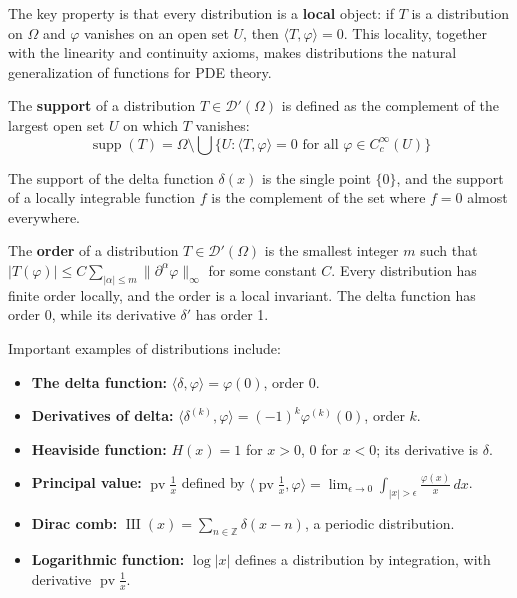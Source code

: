 The key property is that every distribution is a \textbf{local} object: if $T$ is a distribution on $\Omega$ and $\varphi$ vanishes on an open set $U$, then $\langle T, \varphi \rangle = 0$. This locality, together with the linearity and continuity axioms, makes distributions the natural generalization of functions for PDE theory.

\begin{definition}[Support]
The \textbf{support} of a distribution $T \in \mathcal{D}'(\Omega)$ is defined as the complement of the largest open set $U$ on which $T$ vanishes:
\[\operatorname{supp}(T) = \Omega \setminus \bigcup \{U : \langle T, \varphi \rangle = 0 \text{ for all } \varphi \in C_c^\infty(U)\}\]
\end{definition}

The support of the delta function $\delta(x)$ is the single point $\{0\}$, and the support of a locally integrable function $f$ is the complement of the set where $f = 0$ almost everywhere.

\begin{definition}[Order]
The \textbf{order} of a distribution $T \in \mathcal{D}'(\Omega)$ is the smallest integer $m$ such that $|T(\varphi)| \leq C \sum_{|\alpha| \leq m} \|\partial^\alpha \varphi\|_\infty$ for some constant $C$. Every distribution has finite order locally, and the order is a local invariant. The delta function has order 0, while its derivative $\delta'$ has order 1.
\end{definition}

\begin{example}
Important examples of distributions include:
\begin{itemize}
\item \textbf{The delta function:} $\langle \delta, \varphi \rangle = \varphi(0)$, order 0.
\item \textbf{Derivatives of delta:} $\langle \delta^{(k)}, \varphi \rangle = (-1)^k \varphi^{(k)}(0)$, order $k$.
\item \textbf{Heaviside function:} $H(x) = 1$ for $x > 0$, $0$ for $x < 0$; its derivative is $\delta$.
\item \textbf{Principal value:} $\operatorname{pv}\frac{1}{x}$ defined by $\langle \operatorname{pv}\frac{1}{x}, \varphi \rangle = \lim_{\epsilon \to 0} \int_{|x|>\epsilon} \frac{\varphi(x)}{x} \, dx$.
\item \textbf{Dirac comb:} $\operatorname{III}(x) = \sum_{n \in \mathbb{Z}} \delta(x - n)$, a periodic distribution.
\item \textbf{Logarithmic function:} $\log|x|$ defines a distribution by integration, with derivative $\operatorname{pv}\frac{1}{x}$.
\end{itemize}
\end{example}

